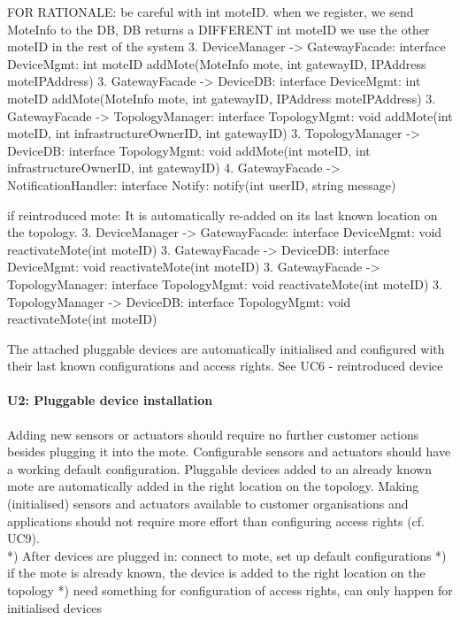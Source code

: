                 FOR RATIONALE: be careful with int moteID. when we register, we send MoteInfo to the DB, DB returns a DIFFERENT int moteID we use the other moteID in the rest of the system
                3. DeviceManager -> GatewayFacade:       interface DeviceMgmt:   int moteID addMote(MoteInfo mote, int gatewayID, IPAddress moteIPAddress)
                3. GatewayFacade -> DeviceDB:            interface DeviceMgmt:   int moteID addMote(MoteInfo mote, int gatewayID, IPAddress moteIPAddress)
                3. GatewayFacade -> TopologyManager:     interface TopologyMgmt: void addMote(int moteID, int infrastructureOwnerID, int gatewayID)
                3. TopologyManager -> DeviceDB:          interface TopologyMgmt: void addMote(int moteID, int infrastructureOwnerID, int gatewayID)
                4. GatewayFacade -> NotificationHandler: interface Notify:       notify(int userID, string message)

        if reintroduced mote:
            It is automatically re-added on its last known location on the topology.
                3. DeviceManager -> GatewayFacade:   interface DeviceMgmt:    void reactivateMote(int moteID)
                3. GatewayFacade -> DeviceDB:        interface DeviceMgmt:    void reactivateMote(int moteID)
                3. GatewayFacade -> TopologyManager: interface TopologyMgmt:  void reactivateMote(int moteID)
                3. TopologyManager -> DeviceDB:      interface TopologyMgmt:  void reactivateMote(int moteID)

            The attached pluggable devices are automatically initialised and configured with their last known configurations and access rights.
                See UC6 - reintroduced device


    \paragraph{U2: Pluggable device installation}
        Adding new sensors or actuators should require no further customer
        actions besides plugging it into the mote. Configurable sensors and
        actuators should have a working default configuration.
        Pluggable devices added to an already known mote are automatically
        added in the right location on the topology.
        Making (initialised) sensors and actuators available to customer
        organisations and applications should not require more effort than
        configuring access rights (cf. UC9). \\
        *) After devices are plugged in: connect to mote, set up default configurations
        *) if the mote is already known, the device is added to the right location on the topology
        *) need something for configuration of access rights, can only happen for initialised devices

